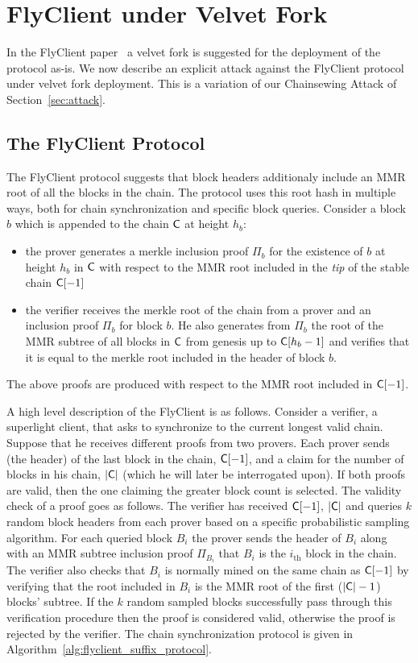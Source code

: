\section{FlyClient under Velvet Fork}
\label{sec:flyclient}
In the FlyClient paper~\cite{flyclient} a velvet fork is suggested for the deployment of the protocol as-is.
We now describe an explicit attack against
the FlyClient protocol under velvet fork deployment.
This is a variation of our Chainsewing Attack of Section~\ref{sec:attack}.

\subsection{The FlyClient Protocol}
	The FlyClient protocol suggests that block headers additionaly include an MMR root of all the blocks in the chain. The protocol uses this root hash in multiple ways, both for chain synchronization and specific block queries. Consider a block $b$ which is appended to the chain $\mathsf{C}$ at height $h_b$:
	\begin{itemize}
		\item the prover generates a merkle inclusion proof $\Pi_b$ for the existence of $b$ at height $h_b$ in $\mathsf{C}$ with respect to the MMR root included in the \emph{tip} of the stable chain $\mathsf{C}[-1]$
		\item the verifier receives the merkle root of the chain from a prover and an inclusion proof $\Pi_b$ for block $b$. He also generates from $\Pi_b$ the root of the MMR subtree of all blocks in $\mathsf{C}$ from genesis up to $\mathsf{C}[h_b - 1]$ and verifies that it is equal to the merkle root included in the header of block $b$.
	\end{itemize}
	The above proofs are produced with respect to the MMR root included in $\mathsf{C}[-1]$.

	\vspace{2mm}
	\noindent
	A high level description of the FlyClient is as follows. Consider a verifier, a superlight client, that asks to synchronize to the current longest valid chain. Suppose that he receives different proofs from two provers. Each prover sends (the header) of the last block in the chain, $\mathsf{C}[-1]$, and a claim for the number of blocks in his chain, $\lvert \mathsf{C} \rvert$ (which he will later be interrogated upon). If both proofs are valid, then the one claiming the greater block count is selected. The validity check of a proof goes as follows.
	The verifier has received $\mathsf{C}[-1]$, $\lvert \mathsf{C} \rvert$ and queries $k$ random block headers from each prover based on a specific probabilistic sampling algorithm. For each queried block $B_i$ the prover sends the header of $B_i$ along with an MMR subtree inclusion proof $\Pi_{B_i}$ that $B_i$ is the $i_\text{th}$ block in the chain. The verifier also checks that $B_i$ is normally mined on the same chain as $\mathsf{C}[-1]$ by verifying that the root included in $B_i$ is the MMR root of the first ($\lvert \mathsf{C} \rvert - 1$) blocks' subtree. If the $k$ random sampled blocks successfully pass through this verification procedure then the proof is considered valid, otherwise the proof is rejected by the verifier.
	The chain synchronization protocol is given in Algorithm~\ref{alg:flyclient_suffix_protocol}.

